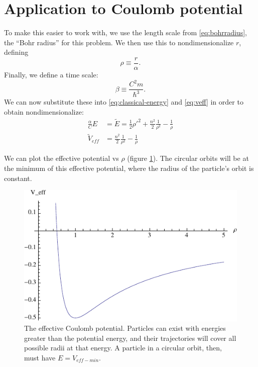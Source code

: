 \documentclass[12pt,twoside]{reedthesis}
\newcommand{\fig}[2]{\begin{figure}\begin{center}#1\end{center}#2\end{figure}}
\begin{document}
\section{Application to Coulomb potential}
To make this easier to work with, we use the length scale from \eqref{eq:bohrradius}, the ``Bohr radius'' for this problem. We then use this to nondimensionalize $r$, defining
\begin{equation}
\rho \equiv \frac{r}{\alpha}\mbox{.}
\label{eq:rho}
\end{equation}
Finally, we define a time scale:
\begin{equation}
\beta \equiv \frac{C^2m}{\hbar^3}\mbox{.}
\label{eq:beta}
\end{equation}
We can now substitute these into \eqref{eq:classical-energy} and \eqref{eq:veff} in order to obtain nondimensionalize:
\begin{align}
\frac{\alpha}{C}E &= \tilde{E}= \frac{1}{2}\rho '^2 + \frac{n^2}{2}\frac{1}{\rho^2}-\frac{1}{\rho} \\
\tilde{V}_{eff} &= \frac{n^2}{2}\frac{1}{\rho^2}-\frac{1}{\rho}
\label{eq:veff-nondim}
\end{align}

We can plot the effective potential vs $\rho$ (figure \ref{fig:hveff}). The circular orbits will be at the minimum of this effective potential, where the radius of the particle's orbit is constant.

\fig{
\includegraphics{Figures/hyd_Veff}}
{\label{fig:hveff}
\caption{The effective Coulomb potential. Particles can exist with energies greater than the potential energy, and their trajectories will cover all possible radii at that energy. A particle in a circular orbit, then, must have $E = V_{eff-min}$.}
}
\end{document}
